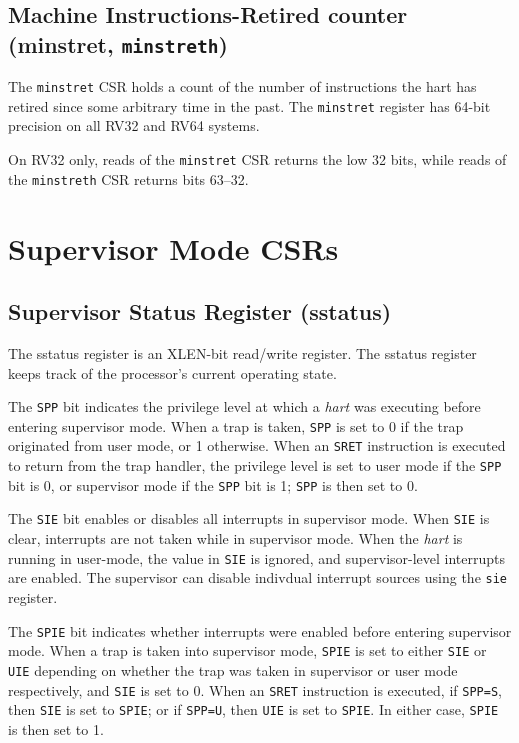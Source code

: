 \subsection{Machine Instructions-Retired counter (minstret,
\texttt{minstreth})}\label{machine-instructions-retired-counter-minstret-minstreth}

The \texttt{minstret} CSR holds a count of the number of instructions the hart
has retired since some arbitrary time in the past. The \texttt{minstret} register
has 64-bit precision on all RV32 and RV64 systems.

On RV32 only, reads of the \texttt{minstret} CSR returns the low 32 bits, while
reads of the \texttt{minstreth} CSR returns bits 63--32.

\section{Supervisor Mode CSRs}\label{supervisor-mode-csrs}

\subsection{Supervisor Status Register (sstatus)
}\label{supervisor-status-register-sstatus}

The sstatus register is an XLEN-bit read/write register. The sstatus register 
keeps track of the processor's current operating state.



The \texttt{SPP} bit indicates the privilege level at which a \emph{hart} was
executing before entering supervisor mode. When a trap is taken, \texttt{SPP} is
set to 0 if the trap originated from user mode, or 1 otherwise. When an
\texttt{SRET} instruction is executed to return from the trap handler, the
privilege level is set to user mode if the \texttt{SPP} bit is 0, or supervisor
mode if the \texttt{SPP} bit is 1; \texttt{SPP} is then set to 0.

The \texttt{SIE} bit enables or disables all interrupts in supervisor mode. When
\texttt{SIE} is clear, interrupts are not taken while in supervisor mode. When
the \emph{hart} is running in user-mode, the value in \texttt{SIE} is ignored,
and supervisor-level interrupts are enabled. The supervisor can disable
indivdual interrupt sources using the \texttt{sie} register.

The \texttt{SPIE} bit indicates whether interrupts were enabled before entering
supervisor mode. When a trap is taken into supervisor mode, \texttt{SPIE} is set
to either \texttt{SIE} or \texttt{UIE} depending on whether the trap was taken in
supervisor or user mode respectively, and \texttt{SIE} is set to 0. When an \texttt{SRET}
instruction is executed, if \texttt{SPP=S}, then \texttt{SIE} is set to \texttt{SPIE}; or if \texttt{SPP=U},
then \texttt{UIE} is set to \texttt{SPIE}. In either case, \texttt{SPIE} is then set to 1.

